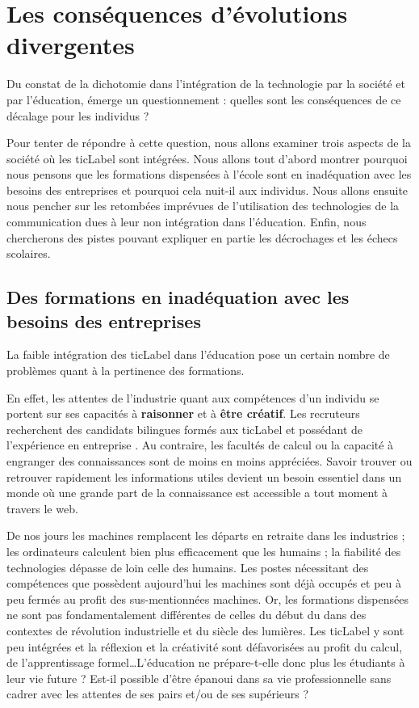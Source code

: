 
\part{Les conséquences d'évolutions divergentes}
Du constat de la dichotomie dans l'intégration de la technologie par la société et par l'éducation, émerge un questionnement : quelles sont les conséquences de ce décalage pour les individus ?

Pour tenter de répondre à cette question, nous allons examiner trois aspects de la société où les \gls{ticLabel} sont intégrées. Nous allons tout d'abord montrer pourquoi nous pensons que les formations dispensées à l'école sont en inadéquation avec les besoins des entreprises et pourquoi cela nuit-il aux individus. Nous allons ensuite nous pencher sur les retombées imprévues de l’utilisation des technologies de la communication dues à leur non intégration dans l'éducation. Enfin, nous chercherons des pistes pouvant expliquer en partie les décrochages et les échecs scolaires.



\chapter{Des formations en inadéquation avec les besoins des entreprises}
La faible intégration des \gls{ticLabel} dans l'éducation pose un certain nombre de problèmes quant à la pertinence des formations.

En effet, les attentes de l'industrie quant aux compétences d'un
individu se portent sur ses capacités à {\bf raisonner} et à {\bf être
  créatif}. Les recruteurs recherchent des candidats bilingues formés aux
\gls{ticLabel} et possédant de l'expérience en entreprise
\cite{DRH_criteres}. Au contraire, les facultés de calcul ou la
capacité à engranger des connaissances sont de moins en moins
appréciées. Savoir trouver ou retrouver rapidement les informations
utiles devient un besoin essentiel dans un monde où une grande part de
la connaissance est accessible a tout moment à travers le web.

De nos jours les machines remplacent les départs en retraite dans les industries ; les ordinateurs calculent bien plus efficacement que les humains ; la fiabilité des technologies dépasse de loin celle des humains. Les postes nécessitant des compétences que possèdent aujourd'hui les machines sont déjà occupés et peu à peu fermés au profit des sus-mentionnées machines. Or, les formations dispensées ne sont pas fondamentalement différentes de celles du début du   \cite{robinson2010paradigms} dans des contextes de révolution industrielle et du siècle des lumières. Les \gls{ticLabel} y sont peu intégrées et la réflexion et la créativité sont défavorisées au profit du calcul, de l'apprentissage formel\ldots L'éducation ne prépare-t-elle donc plus les étudiants à leur vie future \cite{formation_recrutement} ? Est-il possible d'être épanoui dans sa vie professionnelle sans cadrer avec les attentes de ses pairs et/ou de ses supérieurs ?

